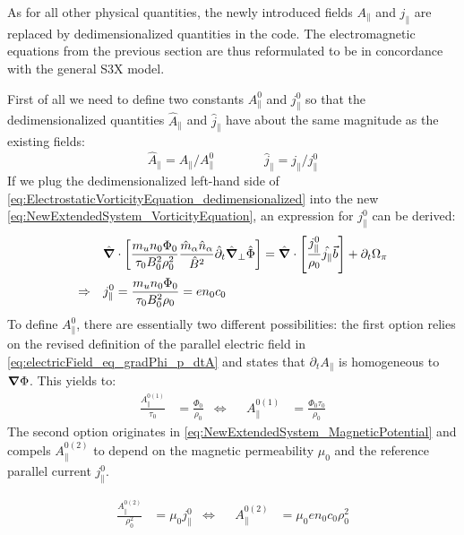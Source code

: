 As for all other physical quantities, the newly introduced fields $A_\parallel$ and $j_\parallel$ are replaced by dedimensionalized quantities in the code. The electromagnetic equations from the previous section are thus reformulated to be in concordance with the general S3X model.

First of all we need to define two constants $A_\parallel^0$ and $j_\parallel^0$ so that the dedimensionalized quantities $\hat{A}_\parallel$ and $\hat{j}_\parallel$ have about the same magnitude as the existing fields:
$$\hat{A}_\parallel = A_\parallel / A_\parallel^0 \qquad\qquad \hat{j}_\parallel = j_\parallel / j_\parallel^0$$
If we plug the dedimensionalized left-hand side of \autoref{eq:ElectrostaticVorticityEquation_dedimensionalized} into the new \autoref{eq:NewExtendedSystem_VorticityEquation}, an expression for $j_\parallel^0$ can be derived:
\begin{align}
	&&&\hat{\grad}\cdot\left[\frac{m_un_0\Phi_0}{\tau_0B_0^2\rho_0^2}\frac{\hat{m}_\alpha \hat{n}_\alpha}{ \hat{B}^2}\hat{\partial}_t\hat{\grad}_\perp\hat{\Phi}\right] = \hat{\grad}\cdot\left[\frac{j_\parallel^0}{\rho_0}\hat{j_\parallel}\vec{b}\right]  + \partial_t \Omega_\pi \nonumber \\
	\Rightarrow&&& j_\parallel^0 = \frac{m_un_0\Phi_0}{\tau_0B_0^2\rho_0} = en_0c_0 \nonumber
\end{align}
To define $A_\parallel^0$, there are essentially two different possibilities: the first option relies on the revised definition of the parallel electric field in \autoref{eq:electricField_eq_gradPhi_p_dtA} and states that $\partial_tA_\parallel$ is homogeneous to $\grad\Phi$. This yields to:
\begin{align}
	\label{eq:FirstOptionApara0}
	\frac{A_\parallel^{0(1)}}{\tau_0} &= \frac{\Phi_0}{\rho_0} &\Leftrightarrow&& A_\parallel^{0(1)} &= \frac{\Phi_0\tau_0}{\rho_0}
\end{align}
The second option originates in \autoref{eq:NewExtendedSystem_MagneticPotential} and compels $A_\parallel^{0(2)}$ to depend on the magnetic permeability $\mu_0$ and the reference parallel current $j_\parallel^0$.

\begin{align}
	\label{eq:SecondOptionApara0}
	\frac{A_\parallel^{0(2)}}{\rho_0^2} &= \mu_0j_\parallel^0 &\Leftrightarrow&& A_\parallel^{0(2)} &= \mu_0en_0c_0\rho_0^2
\end{align}

